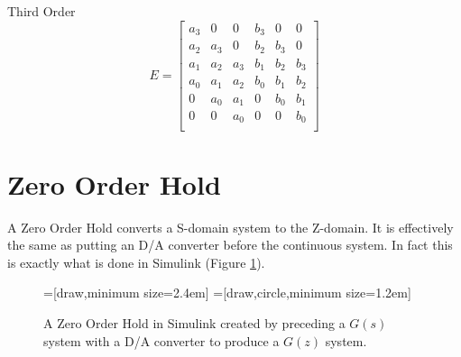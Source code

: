 \documentclass{article}
\begin{document}
Third Order
\[
E=
\begin{bmatrix}
	a_3 & 0 & 0 & b_3 & 0 & 0 \\
	a_2 & a_3 & 0 & b_2 & b_3 & 0 \\
	a_1 & a_2 & a_3 & b_1 & b_2 & b_3 \\
	a_0 & a_1 & a_2 & b_0 & b_1 & b_2 \\
	0 & a_0 & a_1 & 0 & b_0 & b_1 \\
	0 & 0 & a_0 & 0 & 0 & b_0 \\
\end{bmatrix}
\]


\clearpage
\section{Zero Order Hold}
\label{sec:zoh}

A Zero Order Hold converts a S-domain system to the Z-domain.
It is effectively the same as putting an D/A converter before
the continuous system.
In fact this is exactly what is done in Simulink (Figure \ref{fig:simulinkzoh}).

\begin{figure}
\begin{center}
=[draw,minimum size=2.4em]
=[draw,circle,minimum size=1.2em]
\end{center}

\caption{A Zero Order Hold in Simulink created by preceding
a $G(s)$ system with a D/A converter to produce a $G(z)$ system.}
\label{fig:simulinkzoh}
\end{figure}
\end{document}
